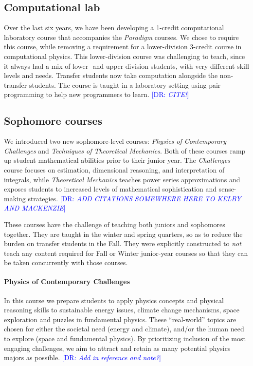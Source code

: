 \documentclass[english,aps,pra,reprint,noshowpacs,superscriptaddress]{revtex4-1}
\newcommand\davidsays[1]{\textcolor{blue}{[\sc DR: {\em#1}]}}
\begin{document}
\subsection{Computational lab}
Over the last six years, we have been developing a 1-credit
computational laboratory course that accompanies the \emph{Paradigm} courses.  We
chose to require this course, while removing a requirement for a
lower-division 3-credit course in computational physics.  This
lower-division course was challenging to teach, since it always had a
mix of lower- and upper-division students, with very different skill
levels and needs.  Transfer students now take computation alongside
the non-transfer students. The course is taught in a laboratory setting using pair
programming to help new programmers to learn. \davidsays{CITE!}

\subsection{Sophomore courses}
We introduced two new sophomore-level courses: \emph{Physics of
Contemporary Challenges} and \emph{Techniques of Theoretical Mechanics}.  Both of
these courses ramp up student mathematical abilities prior to their
junior year.  The \emph{Challenges} course focuses on estimation,
dimensional reasoning, and interpretation of integrals, while
\emph{Theoretical Mechanics} teaches power series approximations and
exposes students to increased levels of mathematical sophistication and
sense-making strategies. \davidsays{ADD CITATIONS SOMEWHERE HERE TO KELBY AND MACKENZIE}

These courses have the challenge of teaching both juniors and sophomores
together.  They are taught in the winter and spring quarters, so
as to reduce the burden on transfer students in the Fall.  They were
explicitly constructed to \emph{not} teach any content required for
Fall or Winter junior-year courses so that they can be taken concurrently with
those courses.

\paragraph{Physics of Contemporary Challenges}
In this course we prepare students to
apply physics concepts and physical reasoning skills to sustainable
energy issues, climate change mechanisms, space exploration and
puzzles in fundamental physics. These ``real-world'' topics are chosen
for either the societal need (energy and climate), and/or the human
need to explore (space and fundamental physics). By prioritizing
inclusion of the most engaging challenges, we aim to attract and
retain as many potential physics majors as possible.
\davidsays{Add in reference and note?}
\end{document}

